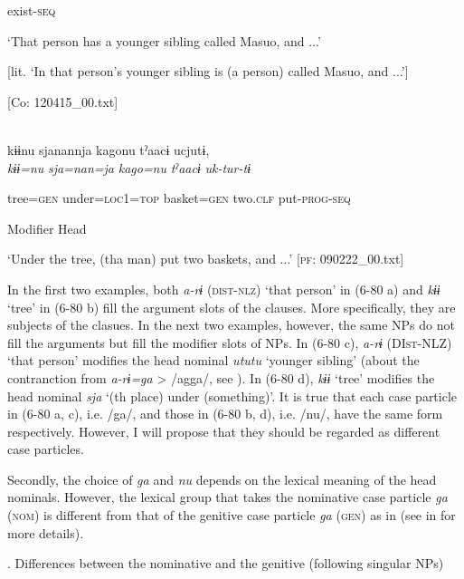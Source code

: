      exist-\textsc{seq}

\glt ‘That person has a younger sibling called Masuo, and ...’

[lit. ‘In that person’s younger sibling is (a person) called Masuo, and ...’]

      [Co: 120415\_00.txt]
\z

 \ex\relax[= (6-62 a)]\\
{\TM}
\gll  kɨɨnu  sjanannja  kagonu  tˀaacɨ  ucjutɨ,\\

      \textit{kɨɨ=nu}  \textit{sja=nan=ja}  \textit{kago=nu}  \textit{tˀaacɨ}  \textit{uk-tur-tɨ}

      tree=\textsc{gen}  under=\textsc{loc}1=\textsc{top}  basket=\textsc{gen}  two.\textsc{clf}  put-\textsc{prog}-\textsc{seq}

      Modifier  Head      

\glt ‘Under the tree, (tha man) put two baskets, and ...’ [\textsc{pf}: 090222\_00.txt]
\z

In the first two examples, both \textit{a-rɨ} (\textsc{dist}-\textsc{nlz}) ‘that person’ in (6-80 a) and \textit{kɨɨ} ‘tree’ in (6-80 b) fill the argument slots of the clauses. More specifically, they are subjects of the clasues. In the next two examples, however, the same NPs do not fill the arguments but fill the modifier slots of NPs. In (6-80 c), \textit{a-rɨ} (DI\textsc{st}-NLZ) ‘that person’ modifies the head nominal \textit{ututu} ‘younger sibling’ (about the contranction from \textit{a-rɨ=ga} > /agga/, see ). In (6-80 d), \textit{kɨɨ} ‘tree’ modifies the head nominal \textit{sja} ‘(th place) under (something)’. It is true that each case particle in (6-80 a, c), i.e. /ga/, and those in (6-80 b, d), i.e. /nu/, have the same form respectively. However, I will propose that they should be regarded as different case particles.

Secondly, the choice of \textit{ga} and \textit{nu} depends on the lexical meaning of the head nominals. However, the lexical group that takes the nominative case particle \textit{ga} (\textsc{nom}) is different from that of the genitive case particle \textit{ga} (\textsc{gen}) as in  (see  in  for more details).

\begin{styleBeschriftung}
\textmd{. Differences between the nominative and the genitive (following singular NPs)}
\end{styleBeschriftung}

